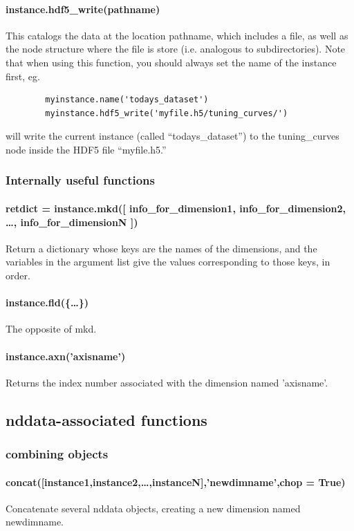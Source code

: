 \paragraph{instance.hdf5_write(pathname)}
This catalogs the data at the location pathname,
    which includes a file, as well as the node structure
    where the file is store
    (i.e. analogous to subdirectories).
Note that when using this function,
    you should always set the name of the instance first, eg.
    \begin{lstlisting}
        myinstance.name('todays_dataset')
        myinstance.hdf5_write('myfile.h5/tuning_curves/')
    \end{lstlisting}
    will write the current instance (called ``todays\_dataset'') to
    the tuning\_curves node inside the HDF5 file ``myfile.h5.''
\subsubsection{Internally useful functions}
\paragraph{retdict = instance.mkd([ info\_for\_dimension1, info\_for\_dimension2, \ldots, info\_for\_dimensionN ])}
Return a dictionary whose keys are the names of the dimensions,
    and the variables in the argument list give the values corresponding
    to those keys, in order.
\paragraph{instance.fld(\{\ldots\})}
The opposite of mkd.
\paragraph{instance.axn('axisname')}
Returns the index number associated with the dimension named 'axisname'.
\subsection{nddata-associated functions}
\subsubsection{combining objects}
\paragraph{concat([instance1,instance2,\ldots,instanceN],'newdimname',chop = True)}
Concatenate several nddata objects, creating a new dimension named newdimname.

